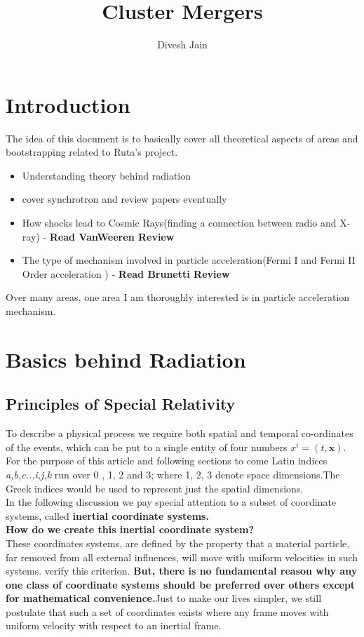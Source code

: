 \documentclass[12pt]{report}
\newcommand{\mbf}[1]{\mathbf{#1}}
\newcommand{\tit}[1]{\textit{#1}}
\begin{document}
\title{Cluster Mergers}
\author{Divesh Jain}
\maketitle
\tableofcontents

\chapter{Introduction}
The idea of this document is to basically cover all theoretical aspects of areas and bootstrapping related to Ruta's project. 
\begin{itemize}
\item Understanding theory behind radiation
\item cover synchrotron and review papers eventually
\item How shocks lead to Cosmic Rays(finding a connection between radio and X-ray) - \textbf{Read VanWeeren Review}
\item The type of mechanism involved in particle acceleration(Fermi I and Fermi II Order acceleration ) - \textbf{Read Brunetti Review}
\end{itemize}
Over many areas, one area I am thoroughly interested is in particle acceleration mechanism.
\chapter{Basics behind Radiation}
\section{Principles of Special Relativity}
To describe a physical process we require both spatial and temporal co-ordinates of the events, which can be put to a single entity of four numbers $x^i=(t,\mbf{x})$. For the purpose of this article and following sections to come Latin indices \tit{a,b,c..,i,j,k} run over 0 , 1, 2 and 3; where 1, 2, 3 denote space dimensions.The Greek indices would be used to represent just the spatial dimensions.\\

In the following discussion we pay special attention to a subset of coordinate systems, called \textbf{inertial coordinate systems.} \\
\textbf{How do we create this inertial coordinate system?}\\
These coordinates systems, are defined by the property that a material particle, far removed from all external influences, will move with uniform velocities in such systems. verify this criterion. \textbf{But, there is no fundamental reason why any one class of coordinate systems should be preferred over others except for mathematical convenience.}Just to make our lives simpler, we still postulate that such a set of coordinates exists where any frame moves with uniform velocity with respect to an inertial frame.\\
\end{document}

